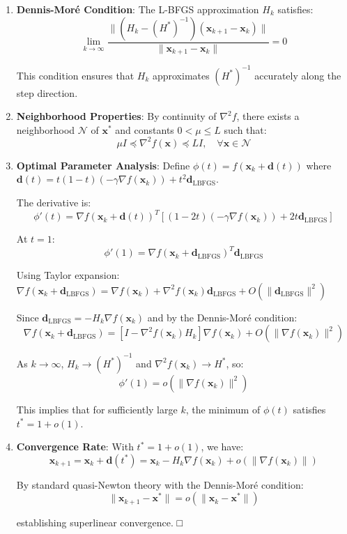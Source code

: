 \begin{enumerate}
\def\labelenumi{\arabic{enumi}.}
\item
  \textbf{Dennis-Moré Condition}: The L-BFGS approximation \(H_k\) satisfies:
  \[\lim_{k \to \infty} \frac{\|(H_k - (H^*)^{-1})(\mathbf{x}_{k+1} - \mathbf{x}_k)\|}{\|\mathbf{x}_{k+1} - \mathbf{x}_k\|} = 0\]

  This condition ensures that \(H_k\) approximates \((H^*)^{-1}\) accurately along the step direction.
\item
  \textbf{Neighborhood Properties}: By continuity of \(\nabla^2 f\), there exists a neighborhood \(\mathcal{N}\) of \(\mathbf{x}^*\) and constants \(0 < \mu \leq L\) such that:
  \[\mu I \preceq \nabla^2 f(\mathbf{x}) \preceq L I, \quad \forall \mathbf{x} \in \mathcal{N}\]
\item
  \textbf{Optimal Parameter Analysis}: Define \(\phi(t) = f(\mathbf{x}_k + \mathbf{d}(t))\) where \(\mathbf{d}(t) = t(1-t)(-\gamma\nabla f(\mathbf{x}_k)) + t^2\mathbf{d}_{\text{LBFGS}}\).

  The derivative is:
  \[\phi'(t) = \nabla f(\mathbf{x}_k + \mathbf{d}(t))^T[(1-2t)(-\gamma\nabla f(\mathbf{x}_k)) + 2t\mathbf{d}_{\text{LBFGS}}]\]

  At \(t = 1\):
  \[\phi'(1) = \nabla f(\mathbf{x}_k + \mathbf{d}_{\text{LBFGS}})^T \mathbf{d}_{\text{LBFGS}}\]

  Using Taylor expansion: \(\nabla f(\mathbf{x}_k + \mathbf{d}_{\text{LBFGS}}) = \nabla f(\mathbf{x}_k) + \nabla^2 f(\mathbf{x}_k)\mathbf{d}_{\text{LBFGS}} + O(\|\mathbf{d}_{\text{LBFGS}}\|^2)\)

  Since \(\mathbf{d}_{\text{LBFGS}} = -H_k\nabla f(\mathbf{x}_k)\) and by the Dennis-Moré condition:
  \[\nabla f(\mathbf{x}_k + \mathbf{d}_{\text{LBFGS}}) = [I - \nabla^2 f(\mathbf{x}_k)H_k]\nabla f(\mathbf{x}_k) + O(\|\nabla f(\mathbf{x}_k)\|^2)\]

  As \(k \to \infty\), \(H_k \to (H^*)^{-1}\) and \(\nabla^2 f(\mathbf{x}_k) \to H^*\), so:
  \[\phi'(1) = o(\|\nabla f(\mathbf{x}_k)\|^2)\]

  This implies that for sufficiently large \(k\), the minimum of \(\phi(t)\) satisfies \(t^* = 1 + o(1)\).
\item
  \textbf{Convergence Rate}: With \(t^* = 1 + o(1)\), we have:
  \[\mathbf{x}_{k+1} = \mathbf{x}_k + \mathbf{d}(t^*) = \mathbf{x}_k - H_k\nabla f(\mathbf{x}_k) + o(\|\nabla f(\mathbf{x}_k)\|)\]

  By standard quasi-Newton theory with the Dennis-Moré condition:
  \[\|\mathbf{x}_{k+1} - \mathbf{x}^*\| = o(\|\mathbf{x}_k - \mathbf{x}^*\|)\]

  establishing superlinear convergence. □
\end{enumerate}

